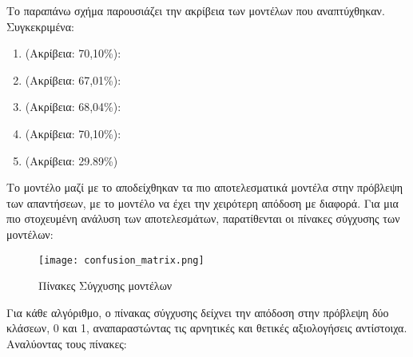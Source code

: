 Το παραπάνω σχήμα παρουσιάζει την ακρίβεια των μοντέλων που
αναπτύχθηκαν. Συγκεκριμένα:

\begin{enumerate}
  \item {} (Ακρίβεια: 70,10\%):
  \item {} (Ακρίβεια: 67,01\%):
  \item {} (Ακρίβεια: 68,04\%):
  \item {} (Ακρίβεια: 70,10\%):
  \item {} (Ακρίβεια: 29.89\%)
\end{enumerate}

Το μοντέλο  μαζί με το 
αποδείχθηκαν τα πιο αποτελεσματικά μοντέλα στην πρόβλεψη των
απαντήσεων, με το μοντέλο  να έχει την χειρότερη απόδοση
με διαφορά. Για μια πιο στοχευμένη ανάλυση των αποτελεσμάτων,
παρατίθενται οι πίνακες σύγχυσης των μοντέλων:

\begin{figure}[H]
  \begin{center}
    \texttt{[image: confusion\_matrix.png]}
    \caption{Πίνακες Σύγχυσης μοντέλων}
  \end{center}
  \label{fig:confusionmatrix}
\end{figure}

Για κάθε αλγόριθμο, ο πίνακας σύγχυσης δείχνει την απόδοση στην
πρόβλεψη δύο κλάσεων, 0 και 1, αναπαραστώντας τις αρνητικές και
θετικές αξιολογήσεις αντίστοιχα.
Αναλύοντας τους πίνακες:

